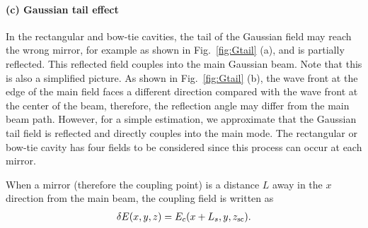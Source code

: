



\paragraph{(c) Gaussian tail effect}
In the rectangular and bow-tie cavities, the tail of the Gaussian field
may reach the wrong mirror, for example as shown in Fig.~\ref{fig:Gtail} (a),
and is partially reflected. This reflected field couples into the main Gaussian beam.
Note that this is also a simplified picture.
As shown in Fig.~\ref{fig:Gtail} (b), the wave front at the edge of the main field
faces a different direction compared with the wave front at the center
of the beam, therefore, the reflection angle may differ from the main beam path.
However, for a simple estimation, we approximate that
the Gaussian tail field is reflected and directly couples into the main mode.
The rectangular or bow-tie cavity has four fields to be considered
since this process can occur at each mirror.

When a mirror (therefore the coupling point) is a distance $L$ away in the $x$ direction
from the main beam, the coupling field is written as
\begin{eqnarray}
\delta E (x,y,z) =E _c  (x+L _s,y,z _{\rm sc}).
\end{eqnarray}

